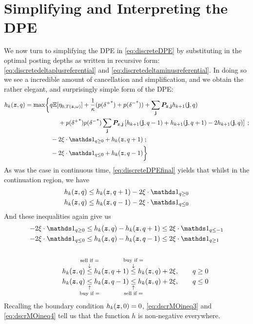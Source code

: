 \section{Simplifying and Interpreting the DPE}
We now turn to simplifying the DPE in \eqref{eq:discreteDPE} by substituting in the optimal posting depths as written in recursive form: \eqref{eq:discretedeltaplusreferential} and \eqref{eq:discretedeltaminusreferential}. In doing so we see a incredible amount of cancellation and simplification, and we obtain the rather elegant, and surprisingly simple form of the DPE:
\begin{equation}
\label{eq:discreteDPEfinal}
\begin{split}
h_k(\bz,q) & = \max \biggl\lbrace 
q\E[\eta_{0,T(\bz, \omega)}] + \frac{1}{\kappa}(p({\delta^+}^*)+p({\delta^-}^*))  + \sum_{\bj} \bP_{\bz,\bj} h_{k+1}(\bj,q) \\ 
& \hphantom{{}={} \max \biggl\lbrace {}+{}} + p({\delta^+}^*)p({\delta^-}^*)\sum_\bj \bP_{\bz,\bj} \left[ h_{k+1}(\bj, q-1) + h_{k+1}(\bj, q+1) -2 h_{k+1}(\bj, q)  \right] \; ; \\
& \hphantom{{}={} \max \biggl\lbrace } -2\xi \cdot \indicator_{q \geq 0} + h_k(\bz,q+1) \; ; \\
& \hphantom{{}={} \max \biggl\lbrace } -2\xi \cdot \indicator_{q \leq 0} + h_k(\bz,q-1) \biggr\rbrace
\end{split}
\end{equation}
As was the case in continuous time, \eqref{eq:discreteDPEfinal} yields that whilst in the continuation region, we have
\begin{align}
h_k(\bz,q) & \leq h_k(\bz, q+1) - 2 \xi \cdot \indicator_{q \geq 0} \\
h_k(\bz,q) & \leq h_k(\bz, q-1) - 2 \xi \cdot \indicator_{q \leq 0}
\end{align}
And these inequalities again give us
\begin{align}
-2\xi \cdot \indicator_{q \geq 0} & \leq h_k(\bz,q) - h_k(\bz,q+1) \leq 2\xi \cdot \indicator_{q \leq -1} \label{eq:dscrMOineq1}\\
-2\xi \cdot \indicator_{q \leq 0} & \leq h_k(\bz,q) - h_k(\bz,q-1) \leq 2\xi \cdot \indicator_{q \geq 1} \label{eq:dscrMOineq2}\\[4ex]
h_k(\bz,q) & \overset{\text{\makebox[0pt]{sell if =}}}{\overset{\downarrow}{\leq}} h_k(\bz,q+1) \overset{\text{\makebox[0pt]{buy if =}}}{\overset{\downarrow}{\leq}} h_k(\bz,q) + 2\xi, \qquad q \geq 0 \label{eq:dscrMOineq3}\\
h_k(\bz,q) & \underset{\text{\makebox[0pt]{buy if =}}}{\underset{\uparrow}{\leq}} h_k(\bz,q-1) \underset{\text{\makebox[0pt]{sell if =}}}{\underset{\uparrow}{\leq}} h_k(\bz,q) + 2\xi, \qquad q \leq 0 \label{eq:dscrMOineq4}
\end{align}
Recalling the boundary condition $h_k(\bm{z},0) = 0$, \eqref{eq:dscrMOineq3} and \eqref{eq:dscrMOineq4} tell us that the function $h$ is non-negative everywhere.

